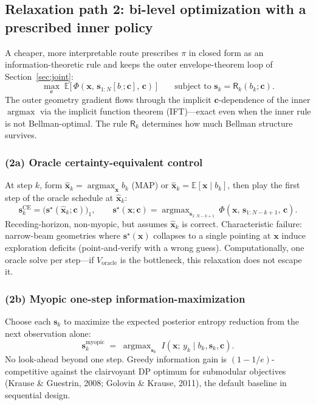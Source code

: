 \documentclass[11pt,a4paper]{article}
\newcommand{\E}{\mathbb{E}}
\newcommand{\argmax}{\operatorname{argmax}}
\begin{document}
\subsection{Relaxation path 2: bi-level optimization with a prescribed inner policy}
\label{subsec:bilevel}

A cheaper, more interpretable route prescribes $\pi$ in closed form as an information-theoretic rule and keeps the outer envelope-theorem loop of Section~\ref{sec:joint}:
\begin{equation}
  \max_{\bm{c}}\; \E\bigl[\,\Phi(\bm{x},\,\bm{s}_{1:N}[b_{\cdot};\bm{c}],\,\bm{c})\,\bigr]
  \qquad\text{subject to } \bm{s}_k = \mathsf{R}_k(b_k;\bm{c}).
  \label{eq:bilevel_general}
\end{equation}
The outer geometry gradient flows through the implicit $\bm{c}$-dependence of the inner $\argmax$ via the implicit function theorem (IFT)---exact even when the inner rule is not Bellman-optimal.  The rule $\mathsf{R}_k$ determines how much Bellman structure survives.

\subsubsection*{(2a) Oracle certainty-equivalent control}

At step $k$, form $\hat{\bm{x}}_k = \argmax_{\bm{x}} b_k$ (MAP) or $\hat{\bm{x}}_k = \E[\bm{x}\mid b_k]$, then play the first step of the oracle schedule at $\hat{\bm{x}}_k$:
\begin{equation}
  \bm{s}_k^{\mathrm{CE}} = \bigl(\bm{s}^\star(\hat{\bm{x}}_k;\bm{c})\bigr)_1,
  \qquad
  \bm{s}^\star(\bm{x};\bm{c}) = \argmax_{\bm{s}_{1:N-k+1}}\,\Phi(\bm{x},\,\bm{s}_{1:N-k+1},\,\bm{c}).
  \label{eq:ce_rule}
\end{equation}
Receding-horizon, non-myopic, but assumes $\hat{\bm{x}}_k$ is correct.  Characteristic failure: narrow-beam geometries where $\bm{s}^\star(\bm{x})$ collapses to a single pointing at $\bm{x}$ induce exploration deficits (point-and-verify with a wrong guess).  Computationally, one oracle solve per step---if $V_{\mathrm{oracle}}$ is the bottleneck, this relaxation does not escape it.

\subsubsection*{(2b) Myopic one-step information-maximization}

Choose each $\bm{s}_k$ to maximize the expected posterior entropy reduction from the next observation alone:
\begin{equation}
  \bm{s}_k^{\mathrm{myopic}} \;=\; \argmax_{\bm{s}_k}\; I(\bm{x};\, y_k \mid b_k, \bm{s}_k, \bm{c}).
  \label{eq:myopic_rule}
\end{equation}
No look-ahead beyond one step.  Greedy information gain is $(1-1/e)$-competitive against the clairvoyant DP optimum for submodular objectives (Krause \& Guestrin, 2008; Golovin \& Krause, 2011), the default baseline in sequential design.
\end{document}
